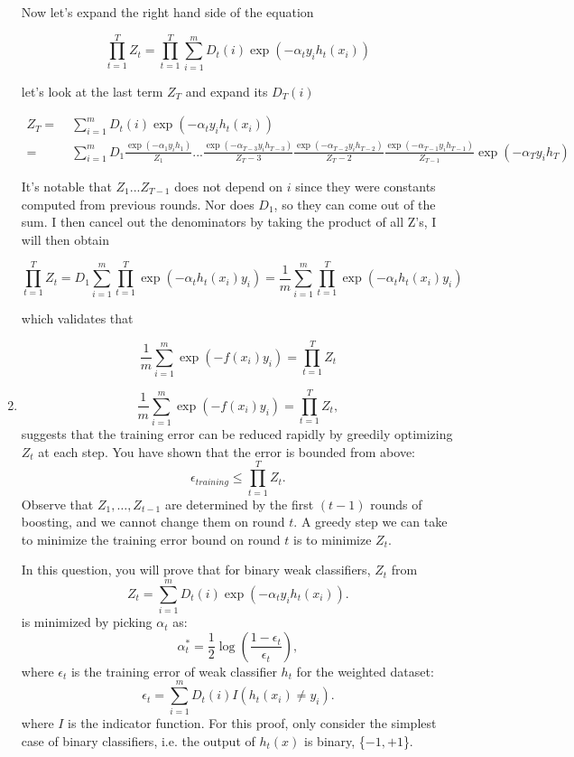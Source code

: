 \documentclass[english]{article}
\begin{document}
\begin{enumerate}
Now let's expand the right hand side of the equation

\[
\prod_{t=1}^T Z_t = \prod_{t=1}^T \sum_{i=1}^m D_t(i) \exp(-\alpha_t y_i h_t(x_i))
\]

let's look at the last term $Z_T$ and expand its $D_T(i)$

\begin{align*}
Z_T =&\; \sum_{i=1}^m D_t(i) \exp(-\alpha_t y_i h_t(x_i))\\
=&\; \sum_{i = 1}^m D_1\frac{\exp(-\alpha_{1} y_i h_{1})}{Z_1}... \frac{\exp(-\alpha_{T-3} y_i h_{T-3})}{Z_T-3} \frac{\exp(-\alpha_{T-2} y_i h_{T-2})}{Z_T-2} \frac{\exp(-\alpha_{T-1} y_i h_{T-1})}{Z_{T-1}}\exp(-\alpha_{T} y_i h_{T})
\end{align*}

It's notable that $Z_1 ... Z_{T-1}$ does not depend on $i$ since they were constants computed from previous rounds. Nor does $D_1$, so they can come out of the sum. I then cancel out the denominators by taking the product of all Z's, I will then obtain

\[\prod_{t=1}^T Z_t = D_1 \sum_{i = 1}^m \prod_{t=1}^T \exp(-\alpha_t h_t(x_i) y_i) =\frac{1}{m} \sum_{i = 1}^m \prod_{t=1}^T \exp(-\alpha_t h_t(x_i) y_i) \]

which validates that

\[\frac{1}{m} \sum_{i=1}^m \exp( -f(x_i)
    y_i) = \prod_{t=1}^T Z_t\]


\item  \begin{equation} \frac{1}{m} \sum_{i=1}^m \exp( -f(x_i)
    y_i) = \prod_{t=1}^T Z_t,
  \end{equation}
 suggests that the
  training error can be reduced rapidly by greedily optimizing $Z_t$
  at each step.  You have shown that the error is bounded from above:
  \[
  \epsilon_{training} \leq \prod_{t=1}^T Z_t.
  \]
  Observe that $Z_1, \dots, Z_{t-1}$ are determined by the first
  $(t-1)$ rounds of boosting, and we cannot change them on round $t$.
  A greedy step we can take to minimize the training error bound on
  round $t$ is to minimize $Z_t$.

  In this question, you will prove that for binary weak classifiers,
  $Z_t$ from 
\begin{equation}
    \label{boosting:normalization_expression} Z_t = \sum_{i=1}^m D_t(i)
    \exp(-\alpha_t y_i h_t(x_i)).
  \end{equation}
 is minimized by picking $\alpha_t$ as:
  \begin{equation}\label{eq:alpha}
    \alpha_t^* = \frac{1}{2}\log\left( \frac{1 - \epsilon_t}{\epsilon_t}
    \right),
  \end{equation}
  where $\epsilon_t$ is the training error of weak classifier $h_t$
  for the weighted dataset:
  \[
  \epsilon_t = \sum_{i=1}^m D_{t}(i) I(h_t(x_i) \neq y_i).
  \]
  where $I$ is the indicator function. For this proof, only consider
  the simplest case of binary classifiers, i.e. the output of $h_t(x)$
  is binary, \{$-1,+1$\}.


\end{enumerate}
\end{document}
